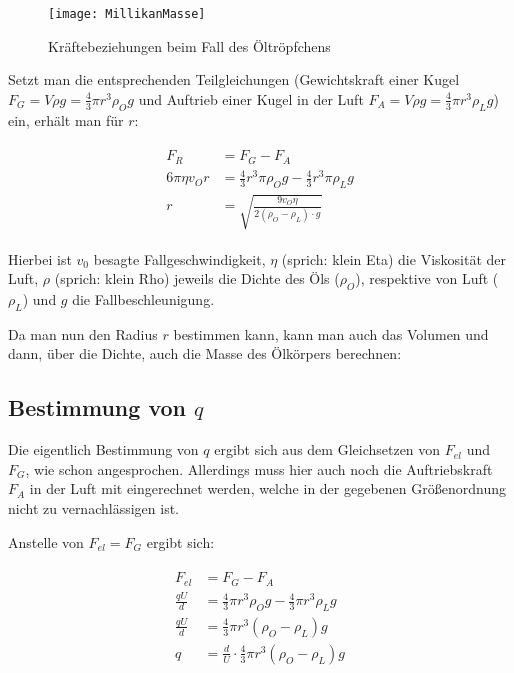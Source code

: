 \begin{figure}[h!]
	\centering
	\texttt{[image: MillikanMasse]}
	\caption{Kräftebeziehungen beim Fall des Öltröpfchens}
	\label{fig:MillikanMasse}
\end{figure}


Setzt man die entsprechenden Teilgleichungen (Gewichtskraft einer Kugel $F_G = V \rho g = \frac{4}{3} \pi r^3 \rho_{O} g$ und Auftrieb einer Kugel in der Luft $F_A = V \rho g = \frac{4}{3} \pi r^3 \rho_L g$) ein, erhält man für $r$:

\begin{align} \label{eq:StokesReibungFuerR}
\begin{split}
	F_R &= F_G - F_A \\
	6 \pi \eta v_O r &= \frac{4}{3} r^3 \pi \rho_{O} g - \frac{4}{3} r^3 \pi \rho_{L} g \\
	r &= \sqrt{\frac{9v_{O}\eta}{2(\rho_{O}-\rho_{L}) \cdot g}}
\end{split}
\end{align}

Hierbei ist $v_{0}$ besagte Fallgeschwindigkeit, $\eta$ (sprich: \glqq klein Eta\grqq) die Viskosität der Luft, $\rho$ (sprich: \glqq klein Rho\grqq) jeweils die Dichte des Öls ($\rho_O$), respektive von Luft ($\rho_L$) und $g$ die Fallbeschleunigung.

Da man nun den Radius $r$ bestimmen kann, kann man auch das Volumen und dann, über die Dichte, auch die Masse des Ölkörpers berechnen:


\subsection{Bestimmung von $q$}

Die eigentlich Bestimmung von $q$ ergibt sich aus dem Gleichsetzen von $F_{el}$ und $F_G$, wie schon angesprochen. Allerdings muss hier auch noch die Auftriebskraft $F_A$ in der Luft mit eingerechnet werden, welche in der gegebenen Größenordnung nicht zu vernachlässigen ist.

Anstelle von $F_{el} = F_G$ ergibt sich:

\begin{align}
\begin{split}
	F_{el} &= F_G - F_A \\
	\frac{qU}{d} &= \frac{4}{3} \pi r^3 \rho_{O} g - \frac{4}{3} \pi r^3\rho_{L} g \\
	\frac{qU}{d} &= \frac{4}{3} \pi  r^3(\rho_{O} - \rho_{L}) g \\
	q &= \frac{d}{U} \cdot \frac{4}{3} \pi r^3 (\rho_{O} - \rho_{L}) g \\
\end{split}
\end{align}

